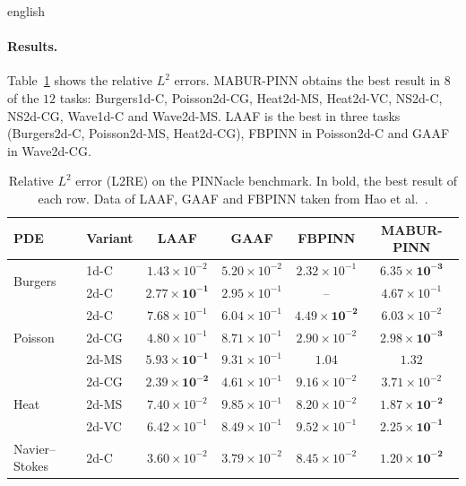 \documentclass[0000.tex]{subfiles}
\begin{document}
\begin{hyphenrules}{english}
\paragraph{Results.}
Table~\ref{tab:benchmark} shows the relative $L^2$ errors. MABUR-PINN obtains the best result in $8$ of the $12$
tasks: Burgers1d-C, Poisson2d-CG, Heat2d-MS, Heat2d-VC, NS2d-C, NS2d-CG, Wave1d-C and Wave2d-MS. LAAF is
the best in three tasks (Burgers2d-C, Poisson2d-MS, Heat2d-CG), FBPINN in Poisson2d-C and GAAF in
Wave2d-CG.

\begin{table}[htbp]
  \centering
  \caption[Relative $L^2$ error (L2RE) on the PINNacle benchmark]{Relative $L^2$ error (L2RE) on the PINNacle benchmark. In bold, the best result of each row.
  Data of LAAF, GAAF and FBPINN taken from Hao et al.~\cite[Table~3]{hao2024pinnacle}.}
  \label{tab:benchmark}
  \small
  \begin{tabular}{@{}llcccc@{}}
    \toprule
    PDE & Variant & LAAF & GAAF & FBPINN & MABUR-PINN \\
    \midrule
    \multirow{2}{*}{Burgers} & 1d-C & $1.43\times10^{-2}$ & $5.20\times10^{-2}$ & $2.32\times10^{-1}$ & $\mathbf{6.35\times10^{-3}}$ \\
                             & 2d-C & $\mathbf{2.77\times10^{-1}}$ & $2.95\times10^{-1}$ & -- & $4.67\times10^{-1}$ \\
    \midrule
    \multirow{3}{*}{Poisson} & 2d-C  & $7.68\times10^{-1}$ & $6.04\times10^{-1}$ & $\mathbf{4.49\times10^{-2}}$ & $6.03\times10^{-2}$ \\
                             & 2d-CG & $4.80\times10^{-1}$ & $8.71\times10^{-1}$ & $2.90\times10^{-2}$ & $\mathbf{2.98\times10^{-3}}$ \\
                             & 2d-MS & $\mathbf{5.93\times10^{-1}}$ & $9.31\times10^{-1}$ & $1.04$ & $1.32$ \\
    \midrule
    \multirow{3}{*}{Heat}    & 2d-CG & $\mathbf{2.39\times10^{-2}}$ & $4.61\times10^{-1}$ & $9.16\times10^{-2}$ & $3.71\times10^{-2}$ \\
                             & 2d-MS & $7.40\times10^{-2}$ & $9.85\times10^{-1}$ & $8.20\times10^{-2}$ & $\mathbf{1.87\times10^{-2}}$ \\
                             & 2d-VC & $6.42\times10^{-1}$ & $8.49\times10^{-1}$ & $9.52\times10^{-1}$ & $\mathbf{2.25\times10^{-1}}$ \\
    \midrule
    \multirow{2}{*}{Navier--Stokes} & 2d-C  & $3.60\times10^{-2}$ & $3.79\times10^{-2}$ & $8.45\times10^{-2}$ & $\mathbf{1.20\times10^{-2}}$ \\

\end{tabular}
\end{table}
\end{hyphenrules}
\end{document}
